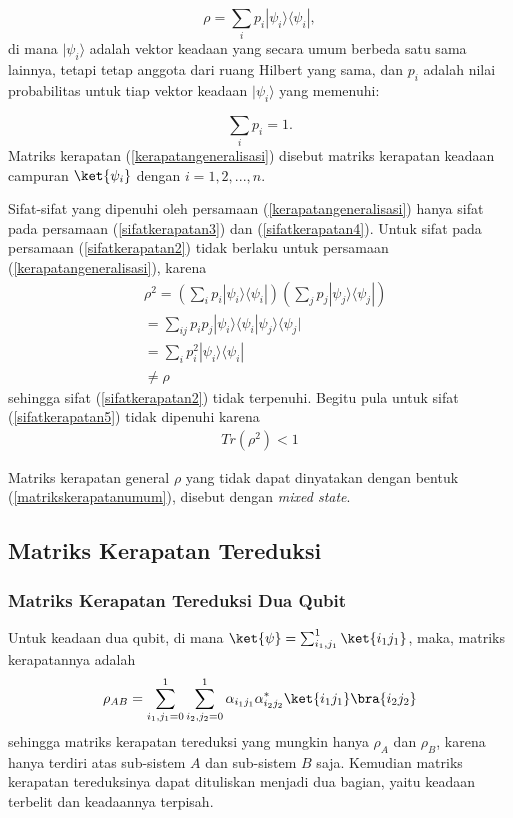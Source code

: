 \begin{equation}
    \rho=\sum_i p_i |\psi_i\rangle\langle\psi_i|,\label{kerapatangeneralisasi}
\end{equation}
di mana $|\psi_i\rangle$ adalah vektor keadaan yang secara umum berbeda satu sama lainnya, tetapi tetap anggota dari ruang Hilbert yang sama, dan $p_i$ adalah nilai probabilitas untuk tiap vektor keadaan $|\psi_i\rangle$ yang memenuhi:

\begin{equation}
    \sum_i p_i = 1.
\end{equation}
Matriks kerapatan (\ref{kerapatangeneralisasi}) disebut matriks kerapatan keadaan campuran $\ket{\psi_i}$ dengan $i=1,2,...,n$.

\par
Sifat-sifat yang dipenuhi oleh persamaan (\ref{kerapatangeneralisasi}) hanya sifat pada persamaan (\ref{sifatkerapatan3}) dan (\ref{sifatkerapatan4}). Untuk sifat pada persamaan (\ref{sifatkerapatan2}) tidak berlaku untuk persamaan (\ref{kerapatangeneralisasi}), karena
\begin{equation}
	\begin{aligned}
		&\rho^2=(\sum_i p_i |\psi_i\rangle\langle\psi_i|)(\sum_j p_j |\psi_j\rangle\langle\psi_j|)\\
		&=\sum_{ij} p_i p_j |\psi_i\rangle \langle\psi_i|\psi_j\rangle \langle\psi_j|\\
		&=\sum_i p_i^2 |\psi_i\rangle\langle\psi_i|\\
		&\neq \rho
	\end{aligned}
\end{equation}
sehingga sifat (\ref{sifatkerapatan2}) tidak terpenuhi. Begitu pula untuk sifat (\ref{sifatkerapatan5}) tidak dipenuhi karena
\begin{equation}
	\begin{aligned}
		Tr(\rho^2)<1
	\end{aligned}
\end{equation}
\par
Matriks kerapatan general $\rho$ yang tidak dapat dinyatakan dengan bentuk (\ref{matrikskerapatanumum}), disebut dengan \textit{mixed state}\cite{nakahara2008quantum}.

\subsection{Matriks Kerapatan Tereduksi}
\subsubsection{Matriks Kerapatan Tereduksi Dua Qubit}
Untuk keadaan dua qubit, di mana $\ket{\psi}=\sum_{i_1,j_1}^{1}\ket{i_1j_1}$, maka, matriks kerapatannya adalah
\begin{equation}
    \rho_{AB}=\sum_{i_1,j_1=0}^1\sum_{i_2,j_2=0}^1\alpha_{i_1j_1}\alpha^{*}_{i_2j_2}\ket{i_1j_1}\bra{i_2j_2}\label{asal2qubit}
\end{equation}
sehingga matriks kerapatan tereduksi yang mungkin hanya $\rho_A$ dan $\rho_B$, karena hanya terdiri atas sub-sistem $A$ dan sub-sistem $B$ saja. Kemudian matriks kerapatan tereduksinya dapat dituliskan menjadi dua bagian, yaitu keadaan terbelit dan keadaannya terpisah.

